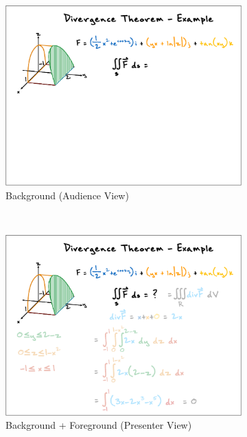 \begin{figure}[t!]
    \centering
    \begin{subfigure}[t]{0.32\textwidth}
        \centering
        \includegraphics[width=1\columnwidth]{figures/videoslide1}
        \caption{Background (Audience View)}
    \end{subfigure}%
    ~ 
    \begin{subfigure}[t]{0.32\textwidth}
        \centering
        \includegraphics[width=1\columnwidth]{figures/videoslide2}
        \caption{Background + Foreground (Presenter View)}
    \end{subfigure}
    ~
        \begin{subfigure}[t]{0.32\textwidth}

\end{subfigure}
\end{figure}
